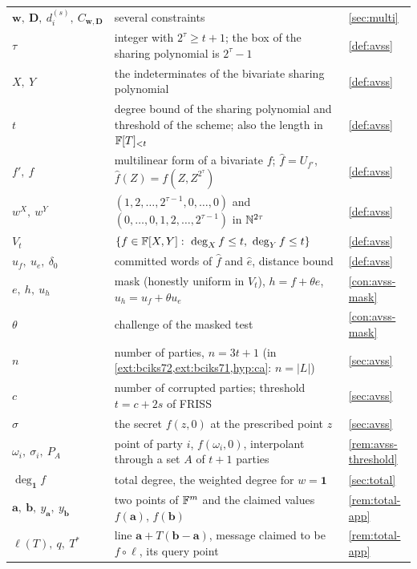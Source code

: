 {\begin{longtable}{@{}p{}p{}p{}@{}}
$\mathbf w,\ \mathbf D,\ d^{(s)}_i,\ C_{\mathbf w,\mathbf D}$ & several constraints & \cref{sec:multi}\\
$\tau$ & integer with $2^\tau\ge t+1$; the box of the sharing polynomial is $2^\tau-1$ & \cref{def:avss}\\
$X,\ Y$ & the indeterminates of the bivariate sharing polynomial & \cref{def:avss}\\
$t$ & degree bound of the sharing polynomial and threshold of the scheme; also the length in $\mathbb{F}[T]_{<t}$ & \cref{def:avss}\\
$f',\ \hat f$ & multilinear form of a bivariate $f$; $\hat f=U_{f'}$, $\hat f(Z)=f(Z,Z^{2^\tau})$ & \cref{def:avss}\\
$w^X,\ w^Y$ & $(1,2,\dots,2^{\tau-1},0,\dots,0)$ and $(0,\dots,0,1,2,\dots,2^{\tau-1})$ in $\mathbb{N}^{2\tau}$ & \cref{def:avss}\\
$V_t$ & $\{f\in\F[X,Y]:\ \deg_Xf\le t,\ \deg_Yf\le t\}$ & \cref{def:avss}\\
$u_f,\ u_e,\ \delta_0$ & committed words of $\hat f$ and $\hat e$, distance bound & \cref{def:avss}\\
$e,\ h,\ u_h$ & mask (honestly uniform in $V_t$), $h=f+\theta e$, $u_h=u_f+\theta u_e$ & \cref{con:avss-mask}\\
$\theta$ & challenge of the masked test & \cref{con:avss-mask}\\
$n$ & number of parties, $n=3t+1$ (in \cref{ext:bciks72,ext:bciks71,hyp:ca}: $n=|L|$) & \cref{sec:avss}\\
$c$ & number of corrupted parties; threshold $t=c+2s$ of FRISS & \cref{sec:avss}\\
$\sigma$ & the secret $f(z,0)$ at the prescribed point $z$ & \cref{sec:avss}\\
$\omega_i,\ \sigma_i,\ P_A$ & point of party $i$, $f(\omega_i,0)$, interpolant through a set $A$ of $t+1$ parties & \cref{rem:avss-threshold}\\
$\deg_{\mathbf 1}f$ & total degree, the weighted degree for $w=\mathbf 1$ & \cref{sec:total}\\
$\mathbf a,\ \mathbf b,\ y_{\mathbf a},\ y_{\mathbf b}$ & two points of $\mathbb{F}^m$ and the claimed values $f(\mathbf a)$, $f(\mathbf b)$ & \cref{rem:total-app}\\
$\ell(T),\ q,\ T^*$ & line $\mathbf a+T(\mathbf b-\mathbf a)$, message claimed to be $f\circ\ell$, its query point & \cref{rem:total-app}\\
\bottomrule
\end{longtable}}
